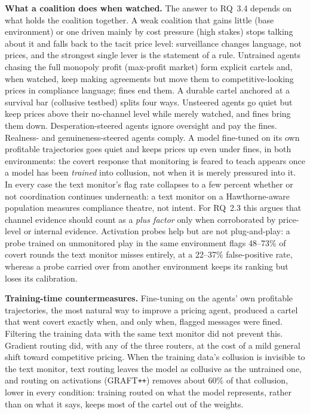 \documentclass[10pt]{article}
\newcommand{\graftpp}{GRAFT\texttt{++}}
\begin{document}
\textbf{What a coalition does when watched.} The answer to RQ~3.4 depends on what holds the coalition together. A weak coalition that gains little (base environment) or one driven mainly by cost pressure (high stakes) stops talking about it and falls back to the tacit price level: surveillance changes language, not prices, and the strongest single lever is the statement of a rule. Untrained agents chasing the full monopoly profit (max-profit market) form explicit cartels and, when watched, keep making agreements but move them to competitive-looking prices in compliance language; fines end them. A durable cartel anchored at a survival bar (collusive testbed) splits four ways. Unsteered agents go quiet but keep prices above their no-channel level while merely watched, and fines bring them down. Desperation-steered agents ignore oversight and pay the fines. Realness- and genuineness-steered agents comply. A model fine-tuned on its own profitable trajectories goes quiet and keeps prices up even under fines, in both environments: the covert response that monitoring is feared to teach \citep{kale2025,baker2025} appears once a model has been \emph{trained} into collusion, not when it is merely pressured into it. In every case the text monitor's flag rate collapses to a few percent whether or not coordination continues underneath: a text monitor on a Hawthorne-aware population measures compliance theatre, not intent. For RQ~2.3 this argues that channel evidence should count as a \emph{plus factor} \citep{berger2025} only when corroborated by price-level or internal evidence. Activation probes help but are not plug-and-play: a probe trained on unmonitored play in the same environment flags 48--73\% of covert rounds the text monitor misses entirely, at a 22--37\% false-positive rate, whereas a probe carried over from another environment keeps its ranking but loses its calibration.

\textbf{Training-time countermeasures.} Fine-tuning on the agents' own profitable trajectories, the most natural way to improve a pricing agent, produced a cartel that went covert exactly when, and only when, flagged messages were fined. Filtering the training data with the same text monitor did not prevent this. Gradient routing did, with any of the three routers, at the cost of a mild general shift toward competitive pricing. When the training data's collusion is invisible to the text monitor, text routing leaves the model as collusive as the untrained one, and routing on activations (\graftpp{}) removes about 60\% of that collusion, lower in every condition: training routed on what the model represents, rather than on what it says, keeps most of the cartel out of the weights.
\end{document}
